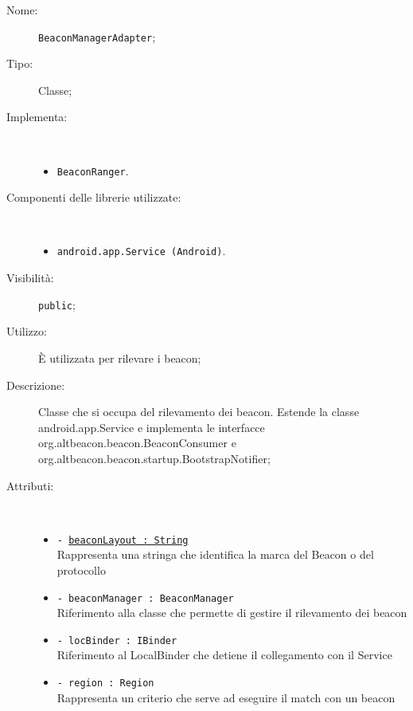 \documentclass[../DefinizioneDiProdotto.tex]{subfiles}
\begin{document}
    \begin{description}
\item[Nome:] \texttt{BeaconManagerAdapter};
\item[Tipo:] Classe;
\item[Implementa:] \
\begin{itemize}
\item \texttt{BeaconRanger}.

\end{itemize}
\item[Componenti delle librerie utilizzate:] \
\begin{itemize}
\item \texttt{android.app.Service (Android)}.

\end{itemize}
\item[Visibilità:] \texttt{public};
\item[Utilizzo:] È utilizzata per rilevare i beacon;
\item[Descrizione:] Classe che si occupa del rilevamento dei beacon. Estende la classe android.app.Service e implementa le interfacce org.altbeacon.beacon.BeaconConsumer e org.altbeacon.beacon.startup.BootstrapNotifier;
\item[Attributi:] \
\begin{itemize}
\item \texttt{- \underline{beaconLayout : String}}\\
Rappresenta una stringa che identifica la marca del Beacon o del protocollo

\item \texttt{- beaconManager : BeaconManager}\\
Riferimento alla classe che permette di gestire il rilevamento dei beacon

\item \texttt{- locBinder : IBinder}\\
Riferimento al LocalBinder che detiene il collegamento con il Service

\item \texttt{- region : Region}\\
Rappresenta un criterio che serve ad eseguire il match con un beacon


\end{itemize}
\end{description}
\end{document}
